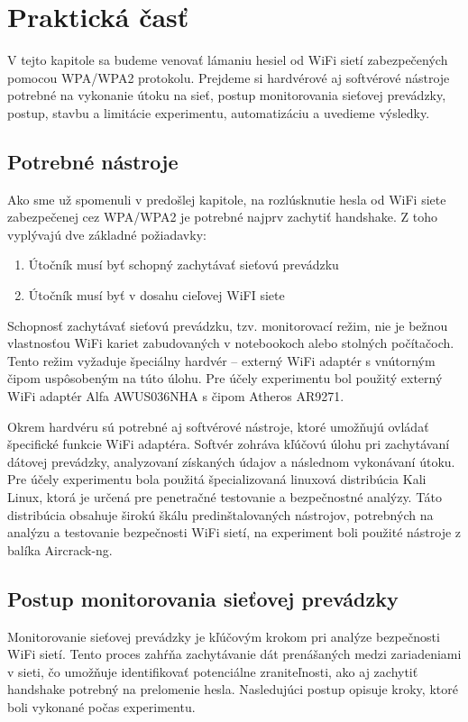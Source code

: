 \documentclass[12pt, twoside]{book}
\begin{document}
\section{Praktická časť}
V tejto kapitole sa budeme venovať lámaniu hesiel od WiFi sietí zabezpečených pomocou WPA/WPA2 protokolu. Prejdeme si hardvérové aj softvérové nástroje potrebné na vykonanie útoku na sieť, postup monitorovania sieťovej prevádzky, postup, stavbu a limitácie experimentu, automatizáciu a uvedieme výsledky.


\subsection{Potrebné nástroje}
Ako sme už spomenuli v predošlej kapitole, na rozlúsknutie hesla od WiFi siete zabezpečenej cez WPA/WPA2 je potrebné najprv zachytiť handshake. Z toho vyplývajú dve základné požiadavky:

\begin{enumerate}
\item Útočník musí byť schopný zachytávať sieťovú prevádzku
\item Útočník musí byť v dosahu cieľovej WiFI siete
\end{enumerate}

Schopnosť zachytávať sieťovú prevádzku, tzv. monitorovací režim, nie je bežnou vlastnosťou WiFi kariet zabudovaných v notebookoch alebo stolných počítačoch. Tento režim vyžaduje špeciálny hardvér – externý WiFi adaptér s vnútorným čipom uspôsobeným na túto úlohu. Pre účely experimentu bol použitý externý WiFi adaptér Alfa AWUS036NHA s čipom Atheros AR9271.

Okrem hardvéru sú potrebné aj softvérové nástroje, ktoré umožňujú ovládať špecifické funkcie WiFi adaptéra. Softvér zohráva kľúčovú úlohu pri zachytávaní dátovej prevádzky, analyzovaní získaných údajov a následnom vykonávaní útoku. Pre účely experimentu bola použitá špecializovaná linuxová distribúcia Kali Linux, ktorá je určená pre penetračné testovanie a bezpečnostné analýzy. Táto distribúcia obsahuje širokú škálu predinštalovaných nástrojov, potrebných na analýzu a testovanie bezpečnosti WiFi sietí, na experiment boli použité nástroje z balíka Aircrack-ng.


\subsection{Postup monitorovania sieťovej prevádzky}
Monitorovanie sieťovej prevádzky je kľúčovým krokom pri analýze bezpečnosti WiFi sietí. Tento proces zahŕňa zachytávanie dát prenášaných medzi zariadeniami v sieti, čo umožňuje identifikovať potenciálne zraniteľnosti, ako aj zachytiť handshake potrebný na prelomenie hesla. Nasledujúci postup opisuje kroky, ktoré boli vykonané počas experimentu.
\end{document}
